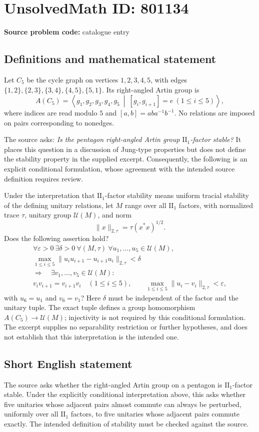 \documentclass[11pt]{article}
\begin{document}
\section*{UnsolvedMath ID: 801134}
\textbf{Source problem code:} catalogue entry
\subsection{Definitions and mathematical statement}
Let \(C_5\) be the cycle graph on vertices \(1,2,3,4,5\), with edges \(\{1,2\},\{2,3\},\{3,4\},\{4,5\},\{5,1\}\). Its right-angled Artin group is
\[
A(C_5)=\left\langle g_1,g_2,g_3,g_4,g_5\ \middle|\ [g_i,g_{i+1}]=e\ (1\leq i\leq 5)\right\rangle,
\]
where indices are read modulo \(5\) and \([a,b]=aba^{-1}b^{-1}\). No relations are imposed on pairs corresponding to nonedges.

The source asks: \emph{Is the pentagon right-angled Artin group \(\mathrm{II}_1\)-factor stable?} It places this question in a discussion of Jung-type properties but does not define the stability property in the supplied excerpt. Consequently, the following is an explicit conditional formulation, whose agreement with the intended source definition requires review.

Under the interpretation that \(\mathrm{II}_1\)-factor stability means uniform tracial stability of the defining unitary relations, let \(M\) range over all \(\mathrm{II}_1\) factors, with normalized trace \(\tau\), unitary group \(\mathcal U(M)\), and norm
\[
\|x\|_{2,\tau}=\tau(x^*x)^{1/2}.
\]
Does the following assertion hold?
\[
\begin{gathered}
\forall\varepsilon>0\ \exists\delta>0\ \forall (M,\tau)\ \forall u_1,\ldots,u_5\in\mathcal U(M),\\
\max_{1\leq i\leq5}\|u_i u_{i+1}-u_{i+1}u_i\|_{2,\tau}<\delta\\
\Longrightarrow\quad
\exists v_1,\ldots,v_5\in\mathcal U(M):\\
v_i v_{i+1}=v_{i+1}v_i\quad(1\leq i\leq5),\qquad
\max_{1\leq i\leq5}\|u_i-v_i\|_{2,\tau}<\varepsilon,
\end{gathered}
\]
with \(u_6=u_1\) and \(v_6=v_1\)? Here \(\delta\) must be independent of the factor and the unitary tuple. The exact tuple defines a group homomorphism \(A(C_5)\to\mathcal U(M)\); injectivity is not required by this conditional formulation. The excerpt supplies no separability restriction or further hypotheses, and does not establish that this interpretation is the intended one.
\subsection{Short English statement}
The source asks whether the right-angled Artin group on a pentagon is \(\mathrm{II}_1\)-factor stable. Under the explicitly conditional interpretation above, this asks whether five unitaries whose adjacent pairs almost commute can always be perturbed, uniformly over all \(\mathrm{II}_1\) factors, to five unitaries whose adjacent pairs commute exactly. The intended definition of stability must be checked against the source.
\end{document}
